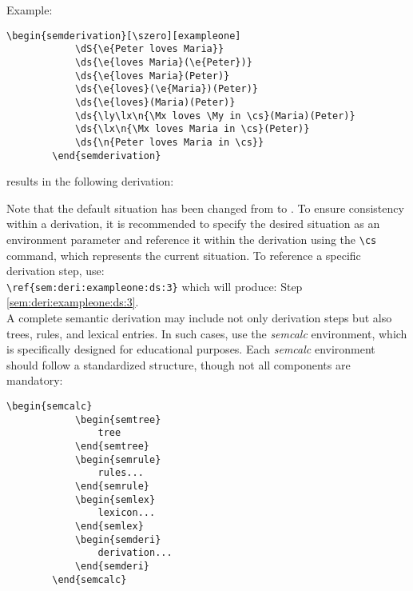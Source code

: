 \documentclass[10pt, a4paper]{article}
\begin{document}
	Example:
	\begin{lstlisting}[style=B]
		\begin{semderivation}[\szero][exampleone]
			\dS{\e{Peter loves Maria}}
			\ds{\e{loves Maria}(\e{Peter})}
			\ds{\e{loves Maria}(Peter)}
			\ds{\e{loves}(\e{Maria})(Peter)}
			\ds{\e{loves}(Maria)(Peter)}
			\ds{\ly\lx\n{\Mx loves \My in \cs}(Maria)(Peter)}
			\ds{\lx\n{\Mx loves Maria in \cs}(Peter)}
			\ds{\n{Peter loves Maria in \cs}}
		\end{semderivation}
	\end{lstlisting} 
	results in the following derivation: \begin{semderivation}[\szero][exampleone]
	\end{semderivation}
	Note that the default situation has been changed from \sstar to \szero. To ensure consistency within a derivation, it is recommended to specify the desired situation as an environment parameter and reference it within the derivation using the \verb=\cs= command, which represents the current situation. To reference a specific derivation step, use:
	\\\verb=\ref{sem:deri:exampleone:ds:3}=
	which will produce: Step \ref{sem:deri:exampleone:ds:3}.
	\\A complete semantic derivation may include not only derivation steps but also trees, rules, and lexical entries. In such cases, use the \textit{semcalc} environment, which is specifically designed for educational purposes. Each \textit{semcalc} environment should follow a standardized structure, though not all components are mandatory:
	\begin{lstlisting}[style=B]
		\begin{semcalc}
			\begin{semtree}
				tree
			\end{semtree}
			\begin{semrule}
				rules...
			\end{semrule}
			\begin{semlex}
				lexicon...
			\end{semlex}
			\begin{semderi}
				derivation...
			\end{semderi}
		\end{semcalc}
	\end{lstlisting}
\end{document}
